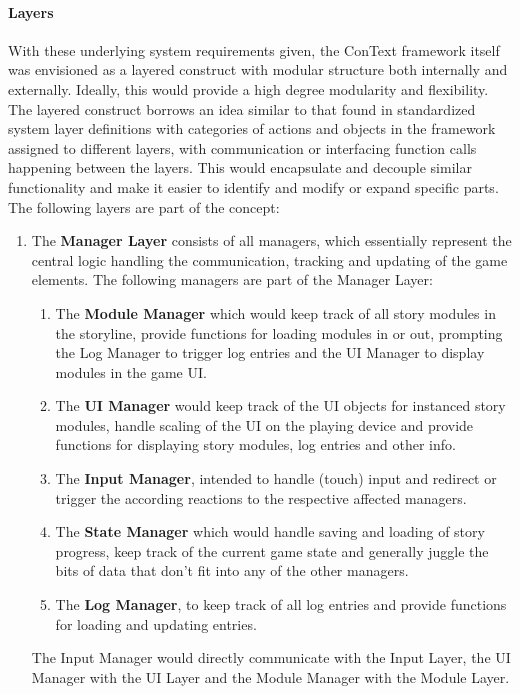 \paragraph{Layers} With these underlying system requirements given, the ConText framework itself was envisioned as a layered construct with modular structure both internally and externally. Ideally, this would provide a high degree modularity and flexibility. 
The layered construct borrows an idea similar to that found in standardized system layer definitions with categories of actions and objects in the framework assigned to different layers, with communication or interfacing function calls happening between the layers. This would encapsulate and decouple similar functionality and make it easier to identify and modify or expand specific parts. The following layers are part of the concept:
\begin{enumerate}
\item The \textbf{Manager Layer} consists of all managers, which essentially represent the central logic handling the communication, tracking and updating of the game elements. The following managers are part of the Manager Layer:
	\begin{enumerate}
	\item The \textbf{Module Manager} which would keep track of all story modules in the storyline, provide functions for loading modules in or out, prompting the Log Manager to trigger log entries and the UI Manager to display modules in the game UI.
	\item The \textbf{UI Manager} would keep track of the UI objects for instanced story modules, handle scaling of the UI on the playing device and provide functions for displaying story modules, log entries and other info.
	\item The \textbf{Input Manager}, intended to handle (touch) input and redirect or trigger the according reactions to the respective affected managers.
	\item The \textbf{State Manager} which would handle saving and loading of story progress, keep track of the current game state and generally juggle the bits of data that don't fit into any of the other managers.
	\item The \textbf{Log Manager}, to keep track of all log entries and provide functions for loading and updating entries.
	\end{enumerate}
	The Input Manager would directly communicate with the Input Layer, the UI Manager with the UI Layer and the Module Manager with the Module Layer.

\end{enumerate}
